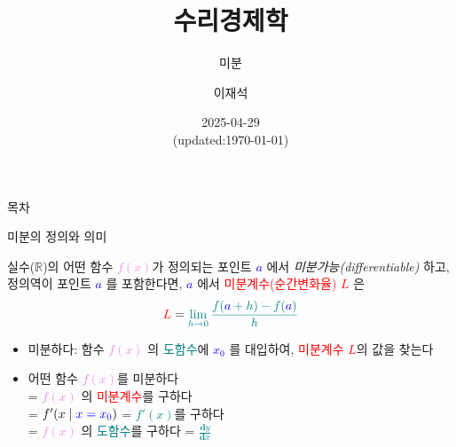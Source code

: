 \documentclass[aspectratio=169]{beamer}
\title{수리경제학}
\subtitle{미분}
\author{이재석}
\date{2025-04-29 \\ (updated:\today)}
\begin{document}
\begin{frame}
  \titlepage
\end{frame}

\begin{frame}{목차}
  \tableofcontents
\end{frame}


% 
%  
\begin{frame}{미분의 정의와 의미}
  \begin{definition}[도함수]
    실수($\mathbb{R}$)의 어떤 함수 \textcolor{violet}{$f(x)$}가 정의되는 포인트 \textcolor{blue}{\emph{$a$}} 에서 \emph{미분가능(differentiable)} 하고, 정의역이 포인트 \textcolor{blue}{\emph{$a$}} 를 포함한다면, \textcolor{blue}{\emph{$a$}} 에서 \textcolor{red}{미분계수(순간변화율)} \textcolor{red}{\emph{$L$}} 은 \\
    \begin{equation}
      \textcolor{red}{L} = \textcolor{teal}{\lim_{h \to 0} \frac{f(\textcolor{blue}{a}+h)-f(\textcolor{blue}{a})}{h}}
    \end{equation}
  \end{definition}
  \begin{itemize}
    \item 미분하다: 함수 \textcolor{violet}{$f(x)$} 의 \textcolor{teal}{도함수}에 \textcolor{blue}{\emph{$x_0$}} 를 대입하여, \textcolor{red}{미분계수 $L$}의 값을 찾는다
    \item 어떤 함수 \textcolor{violet}{$f(x)$}를 미분하다 \\
    = \textcolor{violet}{$f(x)$} 의 \textcolor{red}{미분계수}를 구하다 \\
    = \textcolor{teal}{$f'(x \mid \textcolor{blue}{x = x_0})$}
    = \textcolor{teal}{$f'(x)$}를 구하다 \\
    = \textcolor{violet}{$f(x)$} 의 \textcolor{teal}{도함수}를 구하다 
    = \textcolor{teal}{$\frac{\mathbf{d}y}{\mathbf{d}x}$}
  \end{itemize}
\end{frame}




\end{document}
